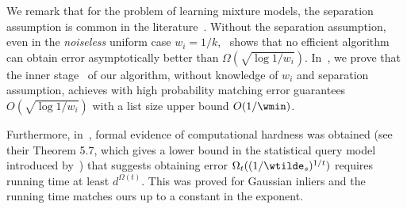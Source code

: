 We remark that for the problem of learning mixture models, the separation assumption is common in the literature~\cite{diakonikolas2018list, hopkins2018mixture, kothari2018robust, liu2022clustering}.
Without the separation assumption, even in the \emph{noiseless} uniform case \(w_i = 1/k\),~\cite{regev2017learning} shows that no efficient algorithm can obtain error asymptotically better than \(\Omega(\sqrt{\log 1 / w_i})\).
In~, we prove that the inner stage~ of our algorithm, without knowledge of $w_i$ and separation assumption, achieves with high probability 
matching error guarantees \(O(\sqrt{\log 1 / w_i})\)
with a list size upper bound \(O(1 / \wmin)\).

Furthermore, in~\cite{diakonikolas2018list}, formal evidence of computational hardness was obtained (see their Theorem 5.7, which gives a lower bound in the statistical query model introduced by~\cite{kearns1998efficient}) that suggests obtaining error $\Omega_t((1/\wtilde_s)^{1/t})$ requires running time at least $d^{\Omega(t)}$.
This was proved for Gaussian inliers and the running time matches ours up to a constant in the exponent.
